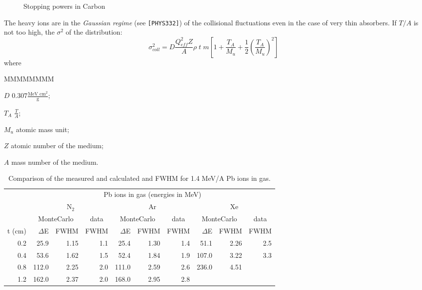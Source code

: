 \begin{figure}[hbt]
     \centering
     \caption{Stopping powers in Carbon}
     \label{fg:phys431-1}
\end{figure}

The heavy ions are in the {\it Gaussian regime} (see {\tt [PHYS332]})
of the collisional fluctuations even in the case of very thin absorbers.
If $T/A$ is not too high, the $\sigma^{2}$ of the distribution:
\begin{equation}
\label{eq:phys431-3}
\sigma^{2}_{coll} = D \frac{Q_{eff}^{2} Z}{A} \rho \; t \; m
\left [ 1 + \frac{T_{A}}{M_{u}} + \frac{1}{2} \left ( \frac{T_{A}}{M_{u}}
\right ) ^{2} \right ]
\end{equation}
where
\begin{DLtt}{MMMMMMMM}
\item[$D$] $\displaystyle 0.307 \frac{\mbox{MeV cm$^{2}$}}{\mbox{g}}$;
\item[$T_{A}$] $\displaystyle \frac{T}{A}$;
\item[$M_{u}$] atomic mass unit;
\item[$Z$] atomic number of the medium;
\item[$A$] mass number of the medium.
\end{DLtt}

\begin{table}
\begin{centering}
\begin{tabular}{|r|rr|r|rr|r|rr|r|}
\hline
& \multicolumn{9}{c|}{Pb ions in gas (energies in MeV)} \\
& \multicolumn{3}{c|}{N$_{2}$} & 
\multicolumn{3}{c|}{Ar} & 
\multicolumn{3}{c|}{Xe} \\
& \multicolumn{2}{c}{MonteCarlo} & \multicolumn{1}{c|}{data} &
\multicolumn{2}{c}{MonteCarlo} & \multicolumn{1}{c|}{data} &
\multicolumn{2}{c}{MonteCarlo} & \multicolumn{1}{c|}{data} \\
t (cm) & 
$\Delta$E & FWHM & FWHM & $\Delta$E & FWHM & FWHM & $\Delta$E & FWHM & FWHM \\
\hline
0.2 & 25.9 & 1.15 & 1.1 & 25.4 & 1.30 & 1.4 & 51.1 & 2.26 & 2.5 \\
0.4 & 53.6 & 1.62 & 1.5 & 52.4 & 1.84 & 1.9 & 107.0 & 3.22 & 3.3 \\
0.8 & 112.0 & 2.25 & 2.0 & 111.0 & 2.59 & 2.6 & 236.0 & 4.51 &  \\
1.2 & 162.0 & 2.37 & 2.0 & 168.0 & 2.95 & 2.8 & & & \\
\hline
\end{tabular}
\caption{Comparison of the measured and calculated and FWHM
for 1.4 MeV/A Pb ions in gas.}
\end{centering}
\label{tb:phys431-3}
\end{table}

